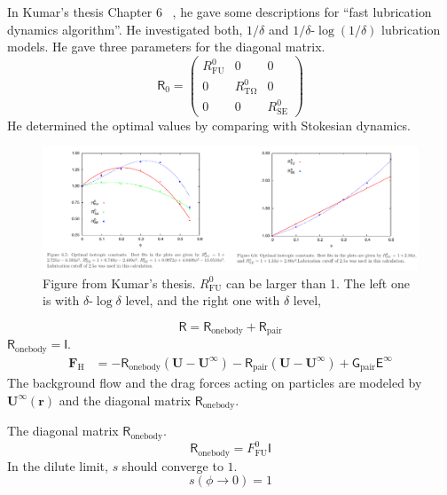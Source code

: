 \documentclass[11pt]{scrartcl}
\newcommand{\tens}[1]{\bm{\mathsf{#1}}}
\begin{document}
In Kumar's thesis Chapter 6 ~\citep{Kumar_2010a},
he gave some descriptions for ``fast lubrication dynamics algorithm''.
%
He investigated both, $1/\delta$ 
and $1/\delta$-$\log(1/\delta)$ lubrication models.
%
He gave three parameters for the diagonal matrix.
\begin{equation}
 \tens{R}_{\mathrm{0}}
=
\begin{pmatrix}
 R_{\mathrm{FU}}^{0} & 0 & 0 \\
 0 &  R_{\mathrm{T\Omega}}^{0}  & 0 \\
 0 &  0 &  R_{\mathrm{SE}}^{0}  
\end{pmatrix}
\end{equation}
He determined the optimal values by comparing with Stokesian dynamics.
\begin{figure}[htbp]
\centering
\includegraphics[width=16cm]{kumars_Rfu0.pdf} 
\caption{
Figure from Kumar's thesis.
$R_{\mathrm{FU}}^{0 }$ can be larger than 1.
%
The left one is with $\delta$-$\log \delta $ level,
and the right one with $\delta$ level,
}
\end{figure}


\begin{equation}
 \tens{R} =  \tens{R}_{\mathrm{onebody}} + \tens{R}_{\mathrm{pair}}
\end{equation}
$\tens{R}_{\mathrm{onebody}} = \tens{I}$.
\begin{align*}
\bm{F}_{\mathrm{H}} 
&=
 - \tens{R}_{\mathrm{onebody}}(\bm{U}-\bm{U}^{\infty})  
 - \tens{R}_{\mathrm{pair}}(\bm{U}-\bm{U}^{\infty})  
+  \tens{G}_{\mathrm{pair}} \tens{E}^{\infty}  
\end{align*}
%
The background flow and the drag forces acting on particles
are modeled by
$\bm{U}^{\infty}(\bm{r})$ and
the diagonal matrix $\tens{R}_{\mathrm{onebody}}$.
%

The diagonal matrix $\tens{R}_{\mathrm{onebody}}$.
%
\begin{equation}
 \tens{R}_{\mathrm{onebody}} 
= F_{\mathrm{FU}}^{0} \tens{I}
\end{equation}
%
In the dilute limit, $s$ should converge to $1$.
\begin{equation}
  s (\phi \to 0) = 1
\end{equation}
\end{document}
